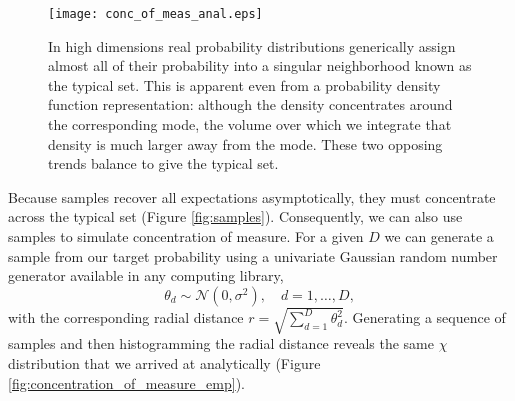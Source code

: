 \documentclass[11pt, oneside]{article}
\begin{document}
\begin{figure*}
\centering
\texttt{[image: conc\_of\_meas\_anal.eps]}
\caption{In high dimensions real probability distributions generically 
assign almost all of their probability into a singular neighborhood known as
the typical set.  This is apparent even from a probability density function 
representation: although the density concentrates around the corresponding
mode, the volume over which we integrate that density is much larger away
from the mode.  These two opposing trends balance to give the typical set.}
\label{fig:conc_of_meas_anal}
\end{figure*}

Because samples recover all expectations asymptotically, they
must concentrate across the typical set (Figure \ref{fig:samples}).
Consequently, we can also use samples to simulate concentration of 
measure.  For a given $D$ we can generate a sample from our target 
probability using a univariate Gaussian random number generator 
available in any computing library,
%
\begin{equation*}
\theta_{d} \sim \mathcal{N} \! \left(0, \sigma^{2} \right), \quad d = 1, \dots, D,
\end{equation*}
%
with the corresponding radial distance $r = \sqrt{ \sum_{d = 1}^{D} \theta_{d}^{2} }$.
Generating a sequence of samples and then histogramming the radial 
distance reveals the same $\chi$ distribution that we arrived at analytically
(Figure \ref{fig:concentration_of_measure_emp}).
\end{document}
